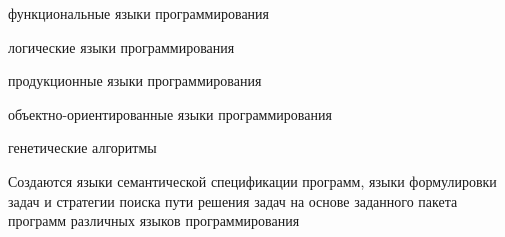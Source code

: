 \begin{scnsubstruct}
{\begin{scnitemize}
{\begin{scnitemizeii}
                \item{функциональные языки программирования}
                \item{логические языки программирования}
                \item{продукционные языки программирования}
                \item{объектно-ориентированные языки программирования}
                \item{генетические алгоритмы}
            \end{scnitemizeii}
        }
        \item{Создаются языки семантической спецификации программ, языки формулировки задач и стратегии поиска пути решения задач на основе заданного пакета программ различных языков программирования}
    \end{scnitemize}
    }
\end{scnsubstruct}
